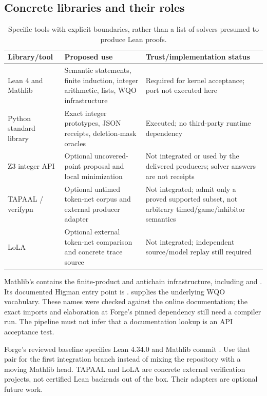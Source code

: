 \documentclass[11pt,a4paper]{article}
\theoremstyle{definition}
\begin{document}
\subsection{Concrete libraries and their roles}
\begin{table}[htbp]
\centering\small
\begin{tabularx}{\textwidth}{@{}p{}XX@{}}
\toprule
Library/tool & Proposed use & Trust/implementation status\\
\midrule
Lean 4 and Mathlib & Semantic statements, finite induction, integer arithmetic, lists, WQO infrastructure & Required for kernel acceptance; port not executed here\\
Python standard library & Exact integer prototypes, JSON receipts, deletion-mask oracles & Executed; no third-party runtime dependency\\
Z3 integer API & Optional uncovered-point proposal and local minimization & Not integrated or used by the delivered producers; solver answers are not receipts\\
TAPAAL / verifypn & Optional untimed token-net corpus and external producer adapter & Not integrated; admit only a proved supported subset, not arbitrary timed/game/inhibitor semantics\\
LoLA & Optional external token-net comparison and concrete trace source & Not integrated; independent source/model replay still required\\
\bottomrule
\end{tabularx}
\caption{Specific tools with explicit boundaries, rather than a list of solvers presumed to produce Lean proofs.}
\end{table}

Mathlib's  contains the finite-product
and antichain infrastructure, including
 and
. Its documented Higman
entry point is
.
 supplies the underlying WQO vocabulary.
These names were checked against the online documentation; the exact imports
and elaboration at Forge's pinned dependency still need a compiler run.
The pipeline must not infer that a documentation lookup is an API acceptance
test.\cite{mathlibwqo,mathlibbasic}

Forge's reviewed baseline specifies Lean 4.34.0 and Mathlib commit
. Use that pair for the first
integration branch instead of mixing the repository with a moving Mathlib
head.\cite{forge} TAPAAL and LoLA are concrete external verification projects,
not certified Lean backends out of the box. Their adapters are optional future
work.\cite{tapaal,lola}
\end{document}
